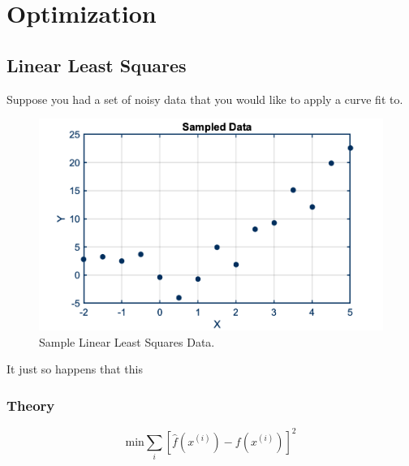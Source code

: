 \section{Optimization}

\subsection{Linear Least Squares}

Suppose you had a set of noisy data that you would like to apply a curve fit to.

\begin{figure}[htb]
    \centering
    \includegraphics[width = 4 in]{Chapters/Computational Methods/Figures/Sample Linear Least Squares Data.png}
    \caption{Sample Linear Least Squares Data.}
    \label{fig:Sample Linear Least Squares Data}
\end{figure}

It just so happens that this

\subsubsection{Theory}

\begin{equation}
    \text{min} \sum_i \left[ \hat{f}\left(x^{(i)}\right) - f\left(x^{(i)} \right) \right]^2
\end{equation}
